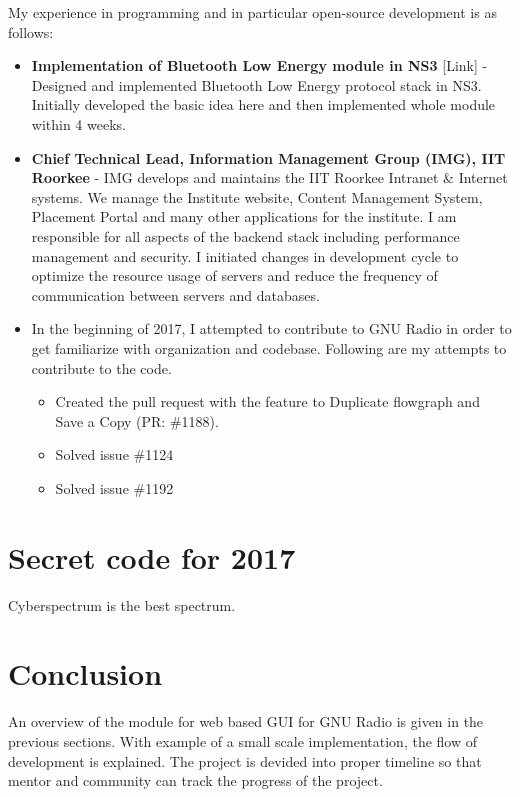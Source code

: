 \documentclass[a4paper, 11pt]{article}
\begin{document}
My experience in programming and in particular open-source development is as follows:
\begin{itemize}
\item \textbf{Implementation of Bluetooth Low Energy module in NS3} [Link] - Designed and implemented Bluetooth Low Energy protocol stack in NS3. Initially developed the basic idea here and then implemented whole module within 4 weeks.
\item \textbf{Chief Technical Lead, Information Management Group (IMG), IIT Roorkee} - IMG develops and maintains the IIT Roorkee Intranet \& Internet systems. We manage the Institute website, Content Management System, Placement Portal and many other applications for the institute. I am responsible for all aspects of the backend stack including performance management and security. I initiated changes in development cycle to optimize the resource usage of servers and reduce the frequency of communication between servers and databases.

\item In the beginning of 2017, I attempted to contribute to GNU Radio in order to get familiarize with organization and codebase. Following are my attempts to contribute to the code.
\begin{itemize}
\item Created the pull request with the feature to Duplicate flowgraph and Save a Copy (PR: \#1188).
\item Solved issue \#1124
\item Solved issue \#1192
\end{itemize}

\end{itemize}


\section{Secret code for 2017}
Cyberspectrum is the best spectrum.


\section{Conclusion}
An overview of the module for web based GUI for GNU Radio is given in the previous sections. With example of a small scale implementation, the flow of development is explained. The project is devided into proper timeline so that mentor and community can track the progress of the project.
\end{document}
